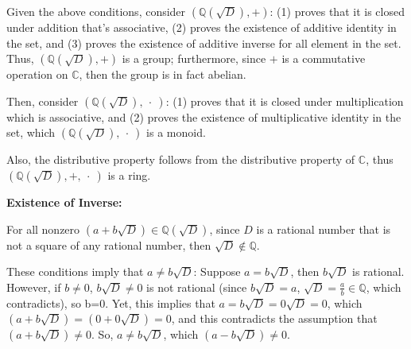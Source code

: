 \documentclass{article}
\begin{document}
\begin{itemize}
    \begin{comment}
    \item[(4)] For all $a,b,c,d,e,f\in\mathbb{R}$, the following equations about distributive property is true:
    $$((a+b\sqrt{D})+(c+d\sqrt{D}))(e+f\sqrt{D}) = ((a+c)+(b+d)\sqrt{D})(e+f\sqrt{D})$$
    $$ = (a+c)e+(a+c)f\sqrt{D} + (b+d)e\sqrt{D}+(b+d)f(\sqrt{D})^2$$
    $$ = ae+ce+af\sqrt{D}+cf\sqrt{D}+be\sqrt{D}+de\sqrt{D}+bfD+dfD$$
    $$ = ((ae+bfD) + (be\sqrt{D}+af\sqrt{D}))+((ce+dfD)+(de\sqrt{D}+cf\sqrt{D})$$
    $$ = (a+b\sqrt{D})(e+f\sqrt{D})+(c+d\sqrt{D})(e+f\sqrt{D})$$
    Which, multiplying $(e+f\sqrt{D})$ from the right side satisfies the distributive property.
    Also, since $\mathbb{C}$ is commutative under multiplication, then multiplying $(e+f\sqrt{D})$ from the left also satisfies the distributive property.
    \end{comment}
\end{itemize}

Given the above conditions, consider $(\mathbb{Q}(\sqrt{D}),+)$: (1) proves that it is closed under addition that's associative,
(2) proves the existence of additive identity in the set, and (3) proves the existence of additive inverse for all element in the set.
Thus, $(\mathbb{Q}(\sqrt{D}),+)$ is a group; furthermore, since $+$ is a commutative operation on $\mathbb{C}$, then the group is in fact abelian.

Then, consider $(\mathbb{Q}(\sqrt{D}),\ \cdot\ )$: (1) proves that it is closed under multiplication which is associative, 
and (2) proves the existence of multiplicative identity in the set, which $(\mathbb{Q}(\sqrt{D}),\ \cdot\ )$ is a monoid.

Also, the distributive property follows from the distributive property of $\mathbb{C}$, thus $(\mathbb{Q}(\sqrt{D}),+,\ \cdot\ )$ is a ring.

\hfill

\textbf{Existence of Inverse:}

For all nonzero $(a+b\sqrt{D})\in\mathbb{Q}(\sqrt{D})$,
since $D$ is a rational number that is not a square of any rational number, then $\sqrt{D}\notin \mathbb{Q}$.

These conditions imply that $a\neq b\sqrt{D}$: Suppose $a=b\sqrt{D}$, then $b\sqrt{D}$ is rational. However, if $b\neq 0$, $b\sqrt{D}\neq 0$ is not rational (since $b\sqrt{D}=a$, $\sqrt{D}=\frac{a}{b}\in\mathbb{Q}$, which contradicts), so b=0.
Yet, this implies that $a=b\sqrt{D}=0\sqrt{D} = 0$, which $(a+b\sqrt{D}) = (0+0\sqrt{D}) = 0$, and this contradicts the assumption that $(a+b\sqrt{D})\neq 0$.
So, $a\neq b\sqrt{D}$, which $(a-b\sqrt{D})\neq 0$.
\end{document}
